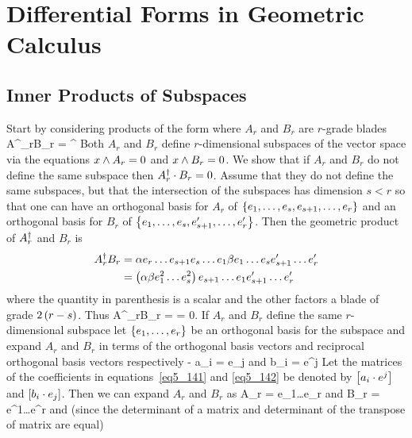 \section{Differential Forms in Geometric Calculus}
\subsection{Inner Products of Subspaces}\label{sect5_6_1}
Start by considering products of the form where $A_{r}$ and $B_{r}$ are $r$-grade blades
\be
 A^{\R}_{r}\cdot B_{r} = ^{\R}\cdot{}
\ee
Both $A_{r}$ and $B_{r}$ define $r$-dimensional subspaces of the vector space via the equations $x\wedge A_{r} = 0$ and $x\wedge B_{r} = 0$.  
We show that if $A_{r}$ and $B_{r}$ do not 
define the same subspace then $A^{\dagger}_{r}\cdot B_{r} = 0$. Assume that they do not define the same subspaces, but
that the intersection of the subspaces has dimension $s<r$ so that one can have an orthogonal basis for $A_{r}$ of
$\left \{ {e_{1},\dots,e_{s},e_{s+1},\dots,e_{r}} \right \}$ and an orthogonal basis for $B_{r}$ of $\left \{ {e_{1},\dots,e_{s},e'_{s+1},\dots,e'_{r}} \right \}$. 
Then the geometric product of $A^{\dagger}_{r}$ and $B_{r}$ is
\begin{align}
 A^{\dagger}_{r}B_{r} &= \alpha e_{r}\dots e_{s+1}e_{s}\dots e_{1}\beta e_{1}\dots e_{s}e'_{s+1}\dots e'_{r} \nonumber \\
            &= \left ( {\alpha\beta e_{1}^{2}\dots e_{s}^{2}} \right ) e_{s+1}\dots e_{1}e'_{s+1}\dots e'_{r}
\end{align}
where the quantity in parenthesis is a scalar and the other factors a blade of grade $2\left ( {r-s} \right )$. Thus 
\be\label{eq5_145}
	A^{\R}_{r}\cdot B_{r} =  = 0.
\ee
If $A_{r}$ and $B_{r}$ define the same $r$-dimensional subspace let $\left \{ {e_{1},\dots, e_{r}} \right \}$ be an orthogonal basis for the subspace and
expand $A_{r}$ and $B_{r}$ in terms of the orthogonal basis vectors and reciprocal orthogonal basis vectors respectively -
\be\label{eq5_141}
	a_{i} = e_{j}
\ee
and 
\be\label{eq5_142}
	b_{i} = e^{j}
\ee
Let the matrices of the coefficients in equations~\ref{eq5_141} and \ref{eq5_142} be denoted by $\left [ {a_{i}\cdot e^{j}} \right ]$ and 
$\left [ {b_{i}\cdot e_{j}} \right ]$.  Then we can expand $A_{r}$ and $B_{r}$ as
\be
	A_{r} = \det{}e_{1}\dots e_{r}
\ee
and
\be
	B_{r} = \det{}e^{1}\dots e^{r}
\ee
and (since the determinant of a matrix and determinant of the transpose of matrix are equal)

